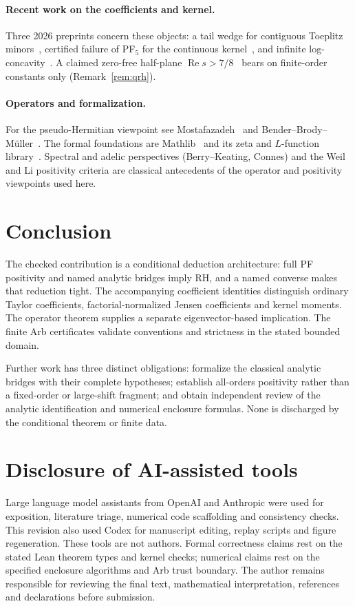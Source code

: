 \documentclass[11pt]{article}
\theoremstyle{plain}
\theoremstyle{definition}
\theoremstyle{remark}
\DeclareMathOperator{\re}{Re}
\begin{document}
\paragraph{Recent work on the coefficients and kernel.} Three 2026 preprints concern
these objects: a tail wedge for contiguous Toeplitz minors~\cite{Michalowski2026wedge},
certified failure of PF$_5$ for the continuous kernel~\cite{Michalowski2026pf5}, and infinite
log-concavity~\cite{LiuMao2026}. A claimed zero-free half-plane $\re s>7/8$~\cite{OpenAI2026QRH}
bears on finite-order constants only (Remark~\ref{rem:qrh}).

\paragraph{Operators and formalization.} For the pseudo-Hermitian viewpoint see
Mostafazadeh~\cite{Mostafazadeh2002} and Bender--Brody--Müller~\cite{BBM2017}. The formal
foundations are Mathlib~\cite{Mathlib2020} and its zeta and $L$-function
library~\cite{LoefflerStoll2025}. Spectral and adelic perspectives (Berry--Keating, Connes)
and the Weil and Li positivity criteria are classical antecedents of the operator and
positivity viewpoints used here.

\section{Conclusion}
The checked contribution is a conditional deduction architecture: full PF
positivity and named analytic bridges imply RH, and a named converse makes
that reduction tight. The accompanying coefficient identities distinguish
ordinary Taylor coefficients, factorial-normalized Jensen coefficients and
kernel moments. The operator theorem supplies a separate eigenvector-based
implication. The finite Arb certificates validate conventions and strictness
in the stated bounded domain.

Further work has three distinct obligations: formalize the classical
analytic bridges with their complete hypotheses; establish all-orders
positivity rather than a fixed-order or large-shift fragment; and obtain
independent review of the analytic identification and numerical enclosure
formulas. None is discharged by the conditional theorem or finite data.

\section*{Disclosure of AI-assisted tools}
Large language model assistants from OpenAI and Anthropic were used for
exposition, literature triage, numerical code scaffolding and consistency
checks. This revision also used Codex for manuscript editing, replay scripts
and figure regeneration. These tools are not authors. Formal correctness
claims rest on the stated Lean theorem types and kernel checks; numerical
claims rest on the specified enclosure algorithms and Arb trust boundary.
The author remains responsible for reviewing the final text, mathematical
interpretation, references and declarations before submission.
\end{document}
